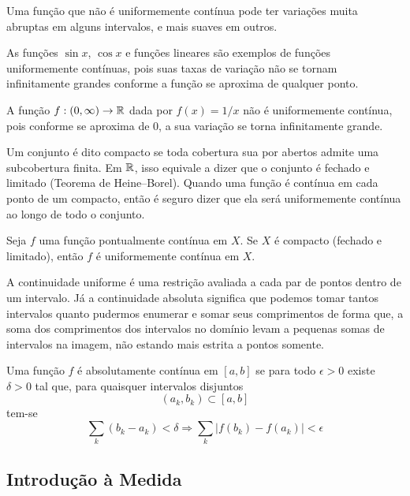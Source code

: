 Uma função que não é uniformemente contínua pode ter variações muita abruptas em alguns
intervalos, e mais suaves em outros.

\begin{exp:uniformemente contínua}
As funções $\sin x$, $\cos x$ e funções lineares são exemplos de funções uniformemente contínuas,
pois suas taxas de variação não se tornam infinitamente grandes conforme a função se
aproxima de qualquer ponto.
\end{exp:uniformemente contínua}

\begin{exp:uniformemente contínua neg}
A função $f: (0, \infty) \to \mathbb{R}$ dada por $f(x) = 1/x$ não é uniformemente contínua, pois conforme se aproxima de $0$,
a sua variação se torna infinitamente grande.
\end{exp:uniformemente contínua neg}

Um conjunto é dito compacto se toda cobertura sua por abertos admite uma subcobertura
finita. Em $\mathbb{R}$, isso equivale a dizer que o conjunto é fechado e limitado
(Teorema de Heine--Borel). Quando uma função é contínua em cada ponto
de um compacto, então é seguro dizer que ela será uniformemente contínua ao longo de
todo o conjunto.

\begin{thm:heine}
Seja $f$ uma função pontualmente contínua em $X$. Se $X$ é
compacto (fechado e limitado), então $f$ é uniformemente contínua em $X$.
\end{thm:heine}

A continuidade uniforme é uma restrição avaliada a cada par de pontos dentro de um
intervalo. Já a continuidade absoluta significa que podemos tomar tantos intervalos
quanto pudermos enumerar e somar seus comprimentos de forma que, a soma dos comprimentos
dos intervalos no domínio levam a pequenas somas de intervalos na imagem, não estando
mais estrita a pontos somente.

\begin{def:absolutamente continua}
\label{def:absolutamente continua}
Uma função $f$ é absolutamente contínua em $[a, b]$ se para todo $\epsilon > 0$ existe
$\delta > 0$ tal que, para quaisquer intervalos disjuntos
\[
	(a_k, b_k) \subset [a, b]
\]
tem-se
\[
	\sum_k (b_k - a_k) < \delta \Longrightarrow \sum_k |f(b_k) - f(a_k)| < \epsilon
\]
\end{def:absolutamente continua}

\subsection{Introdução à Medida}

